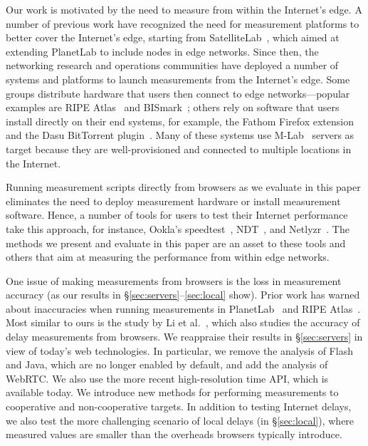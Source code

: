 \documentclass[12pt,twoside]{book}
\begin{document}
Our work is motivated by the need to measure from within the Internet's edge. A number of previous work have recognized the need for measurement platforms to better cover the Internet's edge, starting from SatelliteLab~\cite{satellitelab}, which aimed at extending PlanetLab to include nodes in edge networks. Since then, the networking research and operations communities have deployed a number of systems and platforms to launch measurements from the Internet's edge. Some groups distribute hardware that users then connect to edge networks---popular examples are RIPE Atlas~\cite{ripe-atlas} and BISmark~\cite{bismark}; others rely on software that users install directly on their end systems, for example, the Fathom Firefox extension~\cite{fathom} and the Dasu BitTorrent plugin~\cite{dasu}. Many of these systems use M-Lab~\cite{m-lab} servers as target because they are well-provisioned and connected to multiple locations in the Internet. 

Running measurement scripts directly from browsers as we evaluate in this paper eliminates the need to deploy measurement hardware or install measurement software. Hence, a number of tools for users to test their Internet performance take this approach, for instance, Ookla's speedtest~\cite{speed-test}, NDT~\cite{www-ndt}, and Netlyzr~\cite{kwnp10netalyzr}. The methods we present and evaluate in this paper are an asset to these tools and others that aim at measuring the performance from within edge networks. 

One issue of making measurements from browsers is the loss in measurement accuracy (as our results in \S\ref{sec:servers}--\ref{sec:local} show). Prior work has warned about inaccuracies when running measurements in PlanetLab~\cite{Sommers07} and RIPE Atlas~\cite{holterbach:2015}. Most similar to ours is the study by Li et al.~\cite{li:imc2013}, which also studies the accuracy of delay measurements from browsers. We reappraise their results in \S\ref{sec:servers} in view of today's web technologies. In particular, we remove the analysis of Flash and Java, which are no longer enabled by default, and add the analysis of WebRTC. We also use the more recent high-resolution time API, which is available today. We introduce new methods for performing measurements to cooperative and non-cooperative targets.  In addition to testing Internet delays, we also test the more challenging scenario of local delays (in \S\ref{sec:local}), where measured values are smaller than the overheads browsers typically introduce.
\end{document}
